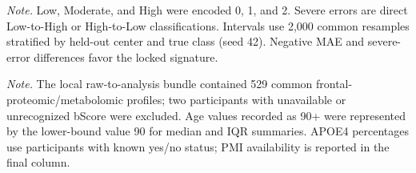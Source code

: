 





















{\footnotesize\noindent\textit{Note.} Low, Moderate, and High were encoded 0, 1, and 2. Severe errors are direct Low-to-High or High-to-Low classifications. Intervals use 2,000 common resamples stratified by held-out center and true class (seed 42). Negative MAE and severe-error differences favor the locked signature.\par}






{\footnotesize\noindent\textit{Note.} The local raw-to-analysis bundle contained 529 common frontal-proteomic/metabolomic profiles; two participants with unavailable or unrecognized bScore were excluded. Age values recorded as 90+ were represented by the lower-bound value 90 for median and IQR summaries. APOE4 percentages use participants with known yes/no status; PMI availability is reported in the final column.\par}





